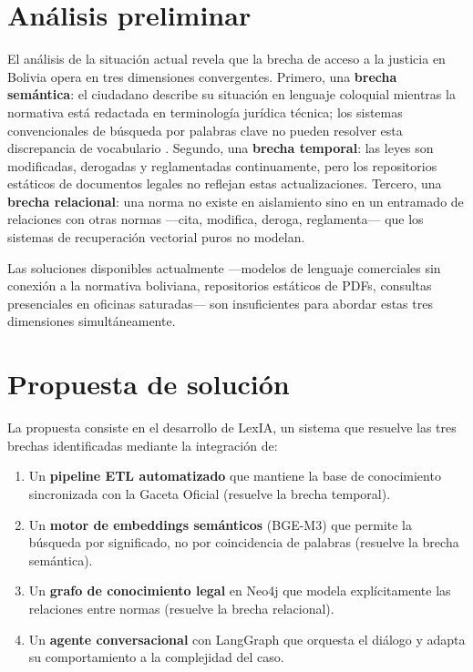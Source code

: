 \documentclass[12pt, letterpaper]{report}
\begin{document}
\section{An\'{a}lisis preliminar}

El an\'{a}lisis de la situaci\'{o}n actual revela que la brecha de acceso a la justicia en Bolivia opera en tres dimensiones convergentes. Primero, una \textbf{brecha sem\'{a}ntica}: el ciudadano describe su situaci\'{o}n en lenguaje coloquial mientras la normativa est\'{a} redactada en terminolog\'{i}a jur\'{i}dica t\'{e}cnica; los sistemas convencionales de b\'{u}squeda por palabras clave no pueden resolver esta discrepancia de vocabulario \cite{manning2008}. Segundo, una \textbf{brecha temporal}: las leyes son modificadas, derogadas y reglamentadas continuamente, pero los repositorios est\'{a}ticos de documentos legales no reflejan estas actualizaciones. Tercero, una \textbf{brecha relacional}: una norma no existe en aislamiento sino en un entramado de relaciones con otras normas ---cita, modifica, deroga, reglamenta--- que los sistemas de recuperaci\'{o}n vectorial puros no modelan.

Las soluciones disponibles actualmente ---modelos de lenguaje comerciales sin conexi\'{o}n a la normativa boliviana, repositorios est\'{a}ticos de PDFs, consultas presenciales en oficinas saturadas--- son insuficientes para abordar estas tres dimensiones simult\'{a}neamente.

\section{Propuesta de soluci\'{o}n}

La propuesta consiste en el desarrollo de LexIA, un sistema que resuelve las tres brechas identificadas mediante la integraci\'{o}n de:

\begin{enumerate}
  \item Un \textbf{pipeline ETL automatizado} que mantiene la base de conocimiento sincronizada con la Gaceta Oficial (resuelve la brecha temporal).
  \item Un \textbf{motor de embeddings sem\'{a}nticos} (BGE-M3) que permite la b\'{u}squeda por significado, no por coincidencia de palabras (resuelve la brecha sem\'{a}ntica).
  \item Un \textbf{grafo de conocimiento legal} en Neo4j que modela expl\'{i}citamente las relaciones entre normas (resuelve la brecha relacional).
  \item Un \textbf{agente conversacional} con LangGraph que orquesta el di\'{a}logo y adapta su comportamiento a la complejidad del caso.
\end{enumerate}
\end{document}
